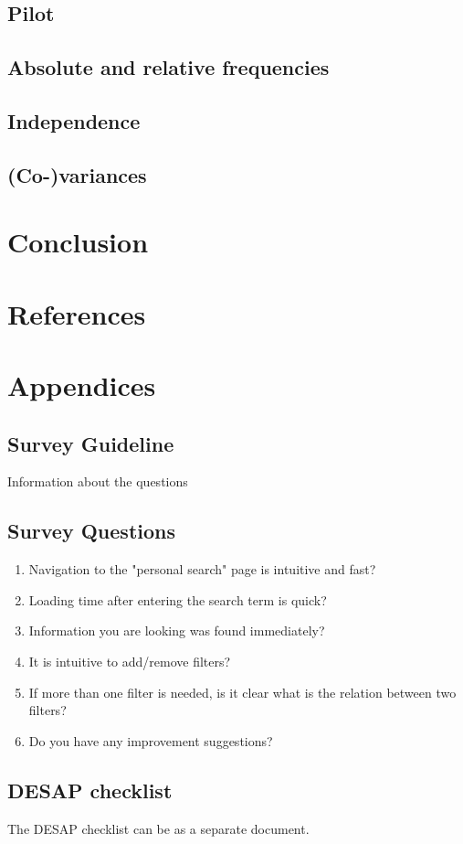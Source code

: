 \documentclass[12pt,a4paper,paper=a4,oneside,titlepage,pdftex]{scrartcl}
\begin{document}
\subsection{Pilot}

\subsection{Absolute and relative frequencies}

\subsection{Independence}

\subsection{(Co-)variances}

\section{Conclusion}

\section*{References}

\renewcommand\refname{\vskip -1cm}


\section*{Appendices}

\subsection*{Survey Guideline}
Information about the questions

\subsection*{Survey Questions}
\begin{enumerate}
	\item Navigation to the "personal search" page is intuitive and fast?
	\item Loading time after entering the search term is quick? 
	\item Information you are looking was found immediately?
	\item It is intuitive to add/remove filters?
	\item If more than one filter is needed, is it clear what is the relation between two filters?
	\item Do you have any improvement suggestions?
\end{enumerate}

\subsection*{DESAP checklist}
The DESAP checklist can be as a separate document.
\end{document}
